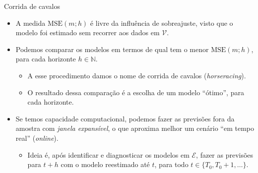 \documentclass[11pt]{beamer}
\begin{document}
\begin{frame}{Corrida de cavalos}
	\begin{itemize}
		\item A medida 	$\text{MSE}(m;h)$ é livre da influência de sobreajuste, visto que o modelo foi estimado sem recorrer aos dados em $\mathcal{V}$.
		\item Podemos comparar os modelos em termos de qual tem o menor $\text{MSE}(m;h)$, para cada horizonte $h \in \mathbb{N}$.
		\begin{itemize}
			\item A esse procedimento damos o nome de corrida de cavalos (\textit{horseracing}).
			\item O resultado dessa comparação é a escolha de um modelo ``ótimo'', para cada horizonte.
		\end{itemize}
		\item Se temos capacidade computacional, podemos fazer as previsões fora da amostra com \emph{janela expansível}, o que aproxima melhor um cenário ``em tempo real'' (\textit{online}).
		\begin{itemize}
			\item Ideia é, após identificar e diagnosticar os modelos em $\mathcal{E}$, fazer as previsões para $t+h$ com o modelo reestimado até $t$, para todo $t \in \{T_0,T_0+1, \ldots\}$.
		\end{itemize}
	\end{itemize}
\end{frame}
\end{document}
